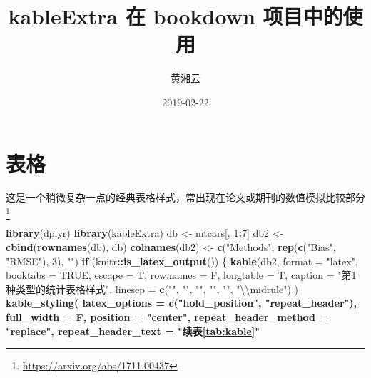 \documentclass[]{book}
\title{kableExtra 在 bookdown 项目中的使用}
\author{黄湘云}
\date{2019-02-22}
\newenvironment{Shaded}{\begin{snugshade}}{\end{snugshade}}
\newcommand{\CharTok}[1]{\textcolor[rgb]{0.31,0.60,0.02}{#1}}
\newcommand{\ControlFlowTok}[1]{\textcolor[rgb]{0.13,0.29,0.53}{\textbf{#1}}}
\newcommand{\DataTypeTok}[1]{\textcolor[rgb]{0.13,0.29,0.53}{#1}}
\newcommand{\DecValTok}[1]{\textcolor[rgb]{0.00,0.00,0.81}{#1}}
\newcommand{\KeywordTok}[1]{\textcolor[rgb]{0.13,0.29,0.53}{\textbf{#1}}}
\newcommand{\NormalTok}[1]{#1}
\newcommand{\OperatorTok}[1]{\textcolor[rgb]{0.81,0.36,0.00}{\textbf{#1}}}
\newcommand{\OtherTok}[1]{\textcolor[rgb]{0.56,0.35,0.01}{#1}}
\newcommand{\StringTok}[1]{\textcolor[rgb]{0.31,0.60,0.02}{#1}}
\let\rmarkdownfootnote\footnote%
\def\footnote{\protect\rmarkdownfootnote}
\begin{document}
\maketitle

{
\hypersetup{linkcolor=black}
\setcounter{tocdepth}{1}
\tableofcontents
}
\hypertarget{table}{%
\chapter{表格}\label{table}}

这是一个稍微复杂一点的经典表格样式，常出现在论文或期刊的数值模拟比较部分\footnote{\url{https://arxiv.org/abs/1711.00437}}

\begin{Shaded}
\begin{Highlighting}[]
\KeywordTok{library}\NormalTok{(dplyr)}
\KeywordTok{library}\NormalTok{(kableExtra)}
\NormalTok{db <-}\StringTok{ }\NormalTok{mtcars[, }\DecValTok{1}\OperatorTok{:}\DecValTok{7}\NormalTok{]}
\NormalTok{db2 <-}\StringTok{ }\KeywordTok{cbind}\NormalTok{(}\KeywordTok{rownames}\NormalTok{(db), db)}
\KeywordTok{colnames}\NormalTok{(db2) <-}\StringTok{ }\KeywordTok{c}\NormalTok{(}\StringTok{"Methods"}\NormalTok{, }\KeywordTok{rep}\NormalTok{(}\KeywordTok{c}\NormalTok{(}\StringTok{"Bias"}\NormalTok{, }\StringTok{"RMSE"}\NormalTok{), }\DecValTok{3}\NormalTok{), }\StringTok{""}\NormalTok{)}
\ControlFlowTok{if}\NormalTok{ (knitr}\OperatorTok{::}\KeywordTok{is_latex_output}\NormalTok{()) \{}
  \KeywordTok{kable}\NormalTok{(db2,}
    \DataTypeTok{format =} \StringTok{"latex"}\NormalTok{, }\DataTypeTok{booktabs =} \OtherTok{TRUE}\NormalTok{, }\DataTypeTok{escape =}\NormalTok{ T, }\DataTypeTok{row.names =}\NormalTok{ F,}
    \DataTypeTok{longtable =}\NormalTok{ T, }\DataTypeTok{caption =} \StringTok{"第1种类型的统计表格样式"}\NormalTok{,}
    \DataTypeTok{linesep =} \KeywordTok{c}\NormalTok{(}\StringTok{""}\NormalTok{, }\StringTok{""}\NormalTok{, }\StringTok{""}\NormalTok{, }\StringTok{""}\NormalTok{, }\StringTok{""}\NormalTok{, }\StringTok{"}\CharTok{\textbackslash{}\textbackslash{}}\StringTok{midrule"}\NormalTok{)}
\NormalTok{  ) }\OperatorTok{%>%}
\StringTok{    }\KeywordTok{kable_styling}\NormalTok{(}
      \DataTypeTok{latex_options =} \KeywordTok{c}\NormalTok{(}\StringTok{"hold_position"}\NormalTok{, }\StringTok{"repeat_header"}\NormalTok{),}
      \DataTypeTok{full_width =}\NormalTok{ F, }\DataTypeTok{position =} \StringTok{"center"}\NormalTok{, }\DataTypeTok{repeat_header_method =} \StringTok{"replace"}\NormalTok{,}
      \DataTypeTok{repeat_header_text =} \StringTok{"续表\ref{tab:kable}"}
}
\end{Highlighting}
\end{Shaded}
\end{document}
